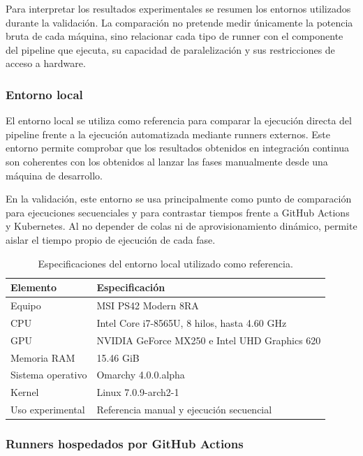 Para interpretar los resultados experimentales se resumen los entornos utilizados durante la validación. La comparación no pretende medir únicamente la potencia bruta de cada máquina, sino relacionar cada tipo de runner con el componente del pipeline que ejecuta, su capacidad de paralelización y sus restricciones de acceso a hardware.

\subsubsection{Entorno local}
\label{subsubsec:entorno-local-validacion}

El entorno local se utiliza como referencia para comparar la ejecución directa del pipeline frente a la ejecución automatizada mediante runners externos. Este entorno permite comprobar que los resultados obtenidos en integración continua son coherentes con los obtenidos al lanzar las fases manualmente desde una máquina de desarrollo.

En la validación, este entorno se usa principalmente como punto de comparación para ejecuciones secuenciales y para contrastar tiempos frente a GitHub Actions y Kubernetes. Al no depender de colas ni de aprovisionamiento dinámico, permite aislar el tiempo propio de ejecución de cada fase.

\begin{table}[htbp]
    \centering
    \caption{Especificaciones del entorno local utilizado como referencia.}
    \label{tab:entorno-local-validacion}
    \begin{tabular}{p{}p{}}
        \hline
        \textbf{Elemento} & \textbf{Especificación} \\
        \hline
        Equipo & MSI PS42 Modern 8RA \\
        CPU & Intel Core i7-8565U, 8 hilos, hasta 4.60 GHz \\
        GPU & NVIDIA GeForce MX250 e Intel UHD Graphics 620 \\
        Memoria RAM & 15.46 GiB \\
        Sistema operativo & Omarchy 4.0.0.alpha \\
        Kernel & Linux 7.0.9-arch2-1 \\
        Uso experimental & Referencia manual y ejecución secuencial \\
        \hline
    \end{tabular}
\end{table}

\subsubsection{Runners hospedados por GitHub Actions}
\label{subsubsec:entorno-github-actions-validacion}

